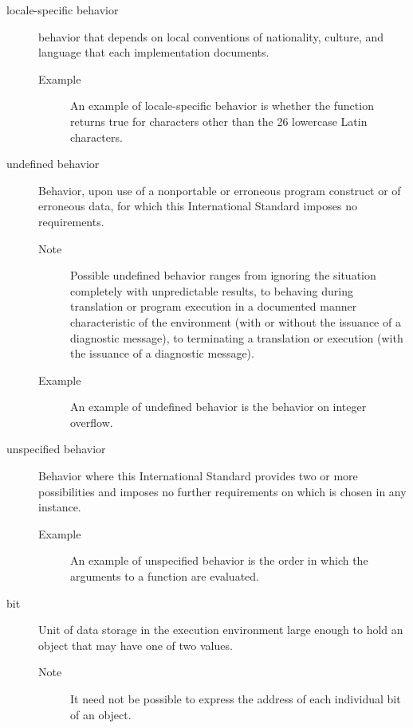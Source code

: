 \begin{faq}
\begin{description}
        \item[locale-specific behavior] behavior that depends on local
        conventions of nationality, culture, and language that each implementation
        documents.
        \begin{description}
                \item[Example] An example of locale-specific behavior is whether 
                the  function returns true for characters other than 
                the 26 lowercase Latin characters.
        \end{description}

        \item[undefined behavior] 
        Behavior, upon use of a nonportable or erroneous program construct or 
        of erroneous data, for which this International Standard imposes
        no requirements.

        \begin{description}
                \item[Note] Possible undefined behavior ranges from ignoring 
                the situation completely with unpredictable results, to behaving 
                during translation or program execution in a documented manner 
                characteristic of the environment (with or without the issuance 
                of a diagnostic message), to terminating a translation or 
                execution (with the issuance of a diagnostic message).
                \item[Example] An example of undefined behavior is the behavior 
                on integer overflow.
        \end{description}

        \item[unspecified behavior]
        Behavior where this International 
        Standard provides two or more possibilities and imposes no further 
        requirements on which is chosen in any instance.
        \begin{description}
                \item[Example] An example of unspecified behavior is the order 
                in which the arguments to a function are evaluated.
        \end{description}

        \item[bit]
        Unit of data storage in the execution environment large enough to hold
        an object that may have one of two values.
        \begin{description}
                \item[Note] It need not be possible to express the address of each individual
        bit of an object.


\end{description}
\end{description}
\end{faq}
